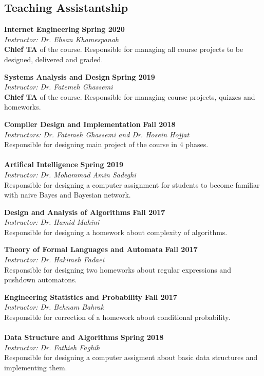 \documentclass[line, mm]{sampleCV}
\begin{document}
\begin{resume}
\section{\mysidestyle Teaching Assistantship}
\textbf{Internet Engineering} \hfill \textbf{Spring 2020}\\
{\it Instructor:  Dr. Ehsan Khamespanah}
\\
\textbf{Chief TA} of the course. Responsible for managing all course projects to be designed, delivered and graded.


\textbf{Systems Analysis and Design} \hfill \textbf{Spring 2019}\\
{\it Instructor:  Dr. Fatemeh Ghassemi}
\\
\textbf{Chief TA} of the course. Responsible for managing course projects, quizzes and homeworks.

\textbf{Compiler Design and Implementation} \hfill \textbf{Fall 2018}\\
{\it Instructors:  Dr. Fatemeh Ghassemi and Dr. Hosein Hojjat}\\
Responsible for designing main project of the course in 4 phases.\\ \\
\textbf{Artifical Intelligence} \hfill \textbf{Spring 2019}\\
{\it Instructor:  Dr. Mohammad Amin Sadeghi} \\
Responsible for designing a computer assignment for students to become familiar with naive Bayes and Bayesian network.

\textbf{Design and Analysis of Algorithms} \hfill \textbf{Fall 2017}\\
{\it Instructor:  Dr. Hamid Mahini}\\
Responsible for designing a homework about complexity of  algorithms.

\textbf{Theory of Formal Languages and Automata} \hfill \textbf{Fall 2017}\\
{\it Instructor:  Dr. Hakimeh Fadaei}\\ 
Responsible for designing two homeworks about regular expressions and pushdown automatons.

\textbf{Engineering Statistics and Probability} \hfill \textbf{Fall 2017}\\
{\it Instructor:  Dr. Behnam Bahrak}\\
Responsible for correction of a homework about conditional probability. \\ \\
\textbf{Data Structure and Algorithms} \hfill \textbf{Spring 2018}\\
{\it Instructor:  Dr. Fathieh Faghih}\\
Responsible for designing a computer assigment about basic data structures and implementing them.


\end{resume}
\end{document}
